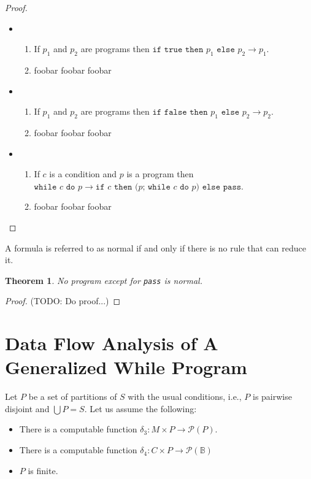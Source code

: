 \documentclass[11pt]{article}
\begin{document}
\begin{proof}
\begin{itemize}
\item
\begin{enumerate}
\item If $p_{1}$ and $p_{2}$ are programs then $\texttt{if true then } p_{1} \texttt{ else } p_{2} \rightarrow p_{1}$.
\item foobar foobar foobar
\end{enumerate}

\item
\begin{enumerate}
\item If $p_{1}$ and $p_{2}$ are programs then $\texttt{if false then } p_{1} \texttt{ else } p_{2} \rightarrow p_{2}$.
\item foobar foobar foobar
\end{enumerate}

\item
\begin{enumerate}
\item If $c$ is a condition and $p$ is a program then $\texttt{while } c \texttt{ do } p \rightarrow \texttt{if } c \texttt{ then (} p \texttt{; while } c \texttt{ do } p \texttt{) else pass}$.
\item foobar foobar foobar
\end{enumerate}

\end{itemize}

\end{proof}

A formula is referred to as normal if and only if there is no rule that can reduce it.

\newtheorem{passisuniquelynormal}{Theorem}
\begin{passisuniquelynormal}
No program except for \texttt{pass} is normal.
\end{passisuniquelynormal}

\begin{proof}
(TODO: Do proof...)
\end{proof}


\section{Data Flow Analysis of A Generalized While Program}

Let $P$ be a set of partitions of $S$ with the usual conditions, i.e., $P$ is pairwise disjoint and $\bigcup P = S$.  Let us assume the following:

\begin{itemize}
\item There is a computable function $\delta_{3} : M \times P \rightarrow \mathcal{P}(P)$.
\item There is a computable function $\delta_{4} : C \times P \rightarrow \mathcal{P}(\mathbb{B})$
\item $P$ is finite.
\end{itemize}
\end{document}
